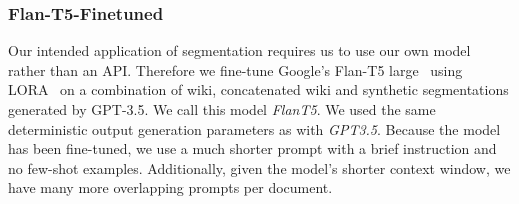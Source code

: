 \subsubsection{Flan-T5-Finetuned}\label{FlanT5}

Our intended application of segmentation requires us to use our own model rather than an API. Therefore we fine-tune Google's Flan-T5 large~\citep{FlanT5} using LORA~\citep{LORA} on a combination of wiki, concatenated wiki and synthetic segmentations generated by GPT-3.5. We call this model \emph{FlanT5}. We used the same deterministic output generation parameters as with \emph{GPT3.5}. Because the model has been fine-tuned, we use a much shorter prompt with a brief instruction and no few-shot examples. Additionally, given the model's shorter context window, we have many more overlapping prompts per document.